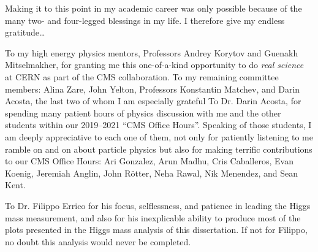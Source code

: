 

Making it to this point in my academic career was only possible because of the many two- and four-legged blessings in my life.
I therefore give my endless gratitude\ldots

To my high energy physics mentors, Professors Andrey Korytov and Guenakh Mitselmakher, for granting me this one-of-a-kind opportunity to do \emph{real science} at CERN as part of the CMS collaboration.
To my remaining committee members: Alina Zare, John Yelton, Professors Konstantin Matchev, and Darin Acosta, the last two of whom I am especially grateful 
To Dr. Darin Acosta, for spending many patient hours of physics discussion with me and the other students within our 2019--2021 ``CMS Office Hours''.
Speaking of those students, I am deeply appreciative to each one of them, not only for patiently listening to me ramble on and on about particle physics but also for making terrific contributions to our CMS Office Hours:
Ari Gonzalez, Arun Madhu, Cris Caballeros, Evan Koenig, Jeremiah Anglin, John Rötter, Neha Rawal, Nik Menendez, and Sean Kent.

To Dr. Filippo Errico for his focus, selflessness, and patience in leading the Higgs mass measurement, and also for his inexplicable ability to produce most of the plots presented in the Higgs mass analysis of this dissertation.
If not for Filippo, no doubt this analysis would never be completed.


